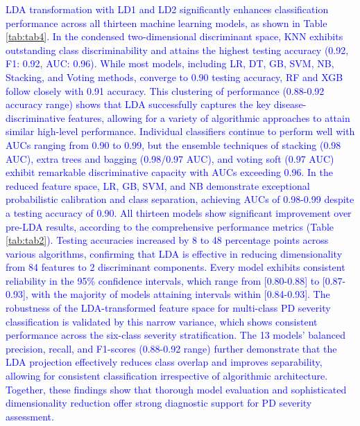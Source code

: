 \documentclass[twocolumn]{article}
\begin{document}
\textcolor{blue}{
LDA transformation with LD1 and LD2 significantly enhances classification performance across all thirteen machine learning models, as shown in Table \ref{tab:tab4}.  In the condensed two-dimensional discriminant space, KNN exhibits outstanding class discriminability and attains the highest testing accuracy (0.92, F1: 0.92, AUC: 0.96).  While most models, including LR, DT, GB, SVM, NB, Stacking, and Voting methods, converge to 0.90 testing accuracy, RF and XGB follow closely with 0.91 accuracy.  This clustering of performance (0.88-0.92 accuracy range) shows that LDA successfully captures the key disease-discriminative features, allowing for a variety of algorithmic approaches to attain similar high-level performance.
Individual classifiers continue to perform well with AUCs ranging from 0.90 to 0.99, but the ensemble techniques of stacking (0.98 AUC), extra trees and bagging (0.98/0.97 AUC), and voting soft (0.97 AUC) exhibit remarkable discriminative capacity with AUCs exceeding 0.96.  In the reduced feature space, LR, GB, SVM, and NB demonstrate exceptional probabilistic calibration and class separation, achieving AUCs of 0.98-0.99 despite a testing accuracy of 0.90.  All thirteen models show significant improvement over pre-LDA results, according to the comprehensive performance metrics (Table \ref{tab:tab2}). Testing accuracies increased by 8 to 48 percentage points across various algorithms, confirming that LDA is effective in reducing dimensionality from 84 features to 2 discriminant components.
Every model exhibits consistent reliability in the 95\% confidence intervals, which range from [0.80-0.88] to [0.87-0.93], with the majority of models attaining intervals within [0.84-0.93].  The robustness of the LDA-transformed feature space for multi-class PD severity classification is validated by this narrow variance, which shows consistent performance across the six-class severity stratification.  The 13 models' balanced precision, recall, and F1-scores (0.88-0.92 range) further demonstrate that the LDA projection effectively reduces class overlap and improves separability, allowing for consistent classification irrespective of algorithmic architecture.  Together, these findings show that thorough model evaluation and sophisticated dimensionality reduction offer strong diagnostic support for PD severity assessment.
}
\end{document}
